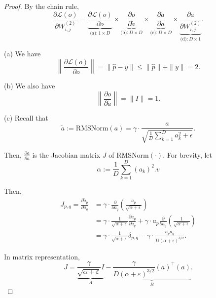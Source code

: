 \begin{proof}
By the chain rule,
\begin{equation}
\frac{\partial \mathcal{L}(o)}{\partial W_{i,j}^{(2)}} = 
    \underbrace{\frac{\partial \mathcal{L}(o)}{\partial o}}_{\text{(a)}: 1 \times D} \times 
    \underbrace{\frac{\partial o}{\partial \tilde{a}}}_{\text{(b)}: D \times D} \times 
    \underbrace{\frac{\partial \tilde{a}}{\partial a}}_{\text{(c)}: D \times D} \times 
    \underbrace{\frac{\partial a}{\partial W_{i,j}^{(2)}}}_{\text{(d)}: D \times 1}.    
\end{equation}


(a) We have
\begin{equation}
    \left\| \frac{\partial \mathcal{L}(o)}{\partial o} \right\| = \| \hat{p} - y \| \leq \| \hat{p} \| + \| y \| = 2.    
\end{equation}

(b) We also have
\begin{equation}
    \left\| \frac{\partial o}{\partial \tilde{a}} \right\| = \| I \| = 1.
\end{equation}


(c) Recall that
\begin{equation}
    \tilde{a} := \mathrm{RMSNorm}(a) = \gamma \cdot \frac{a}{\sqrt{\frac{1}{D} \sum_{k=1}^D a_{k}^2 + \epsilon}}.    
\end{equation}

Then, $\frac{\partial \tilde{a}}{\partial a}$ is the Jacobian matrix $J$ of $\mathrm{RMSNorm}(\cdot)$. For brevity, let
\begin{equation}
    \alpha := \frac{1}{D} \sum_{k=1}^D (a_{k})^2.
v\end{equation}

Then,
\begin{align}
J_{p,q} = \frac{\partial \tilde{a}_{p}}{\partial a_{q}} 
&= \gamma \cdot \frac{\partial}{\partial a_{q}} \left( \frac{a_{p}}{\sqrt{\alpha + \epsilon}} \right) \\
&= \gamma \cdot \frac{1}{\sqrt{\alpha + \epsilon}} \frac{\partial a_{p}}{\partial a_{q}} 
+ \gamma \cdot a_{p} \frac{\partial}{\partial a_{q}} \left( \frac{1}{\sqrt{\alpha + \epsilon}} \right) \\
&= \gamma \cdot \frac{1}{\sqrt{\alpha + \epsilon}} \delta_{p,q} 
- \gamma \cdot \frac{a_{p} a_{q}}{D (\alpha + \epsilon)^{3/2}}.
\end{align}

In matrix representation,
\begin{equation}
    J = \underbrace{\frac{\gamma}{\sqrt{\alpha + \varepsilon}} I}_{A} 
    - \underbrace{\frac{\gamma}{D(\alpha + \varepsilon)^{3/2}} \left(a\right)^\top \left(a\right)}_{B}.
\end{equation}


\end{proof}
